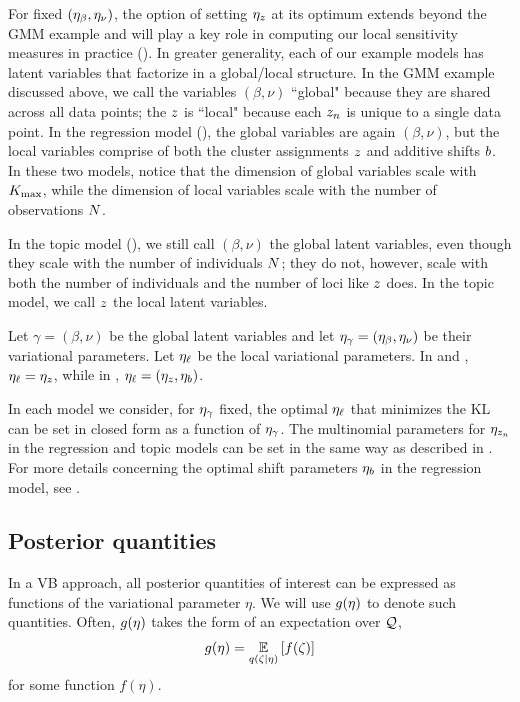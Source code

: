 For fixed $(\eta_{\beta}, \eta_{\nu})$, the option of setting $\eta_{z}$ at its optimum
extends beyond the GMM example and will play
a key role in computing our local sensitivity
measures in practice ().
In greater generality, each of our example models
has latent variables that factorize in a global/local structure.
In the GMM example discussed above, we call the variables $(\beta, \nu)$ ``global"
because they are shared across all data points; the $z$ is ``local"
because each $z_n$ is unique to a single data point.
In the regression model (),
the global variables are again $(\beta, \nu)$,
but the local variables comprise of both the cluster assignments $z$ and additive shifts $b$.
In these two models, notice that the dimension of global variables scale with ${K_{\mathrm{max}}}$, while
the dimension of local variables scale with the number of observations $N$.

In the topic model (),
we still call $(\beta, \nu)$ the global latent variables, even though they scale
with the number of individuals $N$;
they do not, however, scale with both the number of individuals and the number of loci
like $z$ does. In the topic model, we call $z$ the local latent variables.

Let $\gamma = (\beta,\nu)$ be the global latent variables
and let $\eta_{\gamma} = (\eta_{\beta}, \eta_{\nu})$ be their variational parameters.
Let $\eta_{\ell}$ be the local variational parameters. In  and
, $\eta_{\ell} = \eta_{z}$, while
in , $\eta_{\ell} = (\eta_{z}, \eta_b)$.

In each model we consider, for $\eta_{\gamma}$ fixed, the optimal $\eta_{\ell}$ that minimizes
the $\mathrm{KL}$ can be set in closed form as a function of $\eta_{\gamma}$.
The multinomial parameters for $\eta_{z_n}$ in the regression and topic models
can be set in the same way as described in .
For more details concerning the optimal shift parameters $\eta_b$
in the regression model, see .



\subsection{Posterior quantities}

In a VB approach, all posterior quantities of interest can be expressed as
functions of the variational parameter $\eta$. We will use $g(\eta)$ to denote
such quantities. Often, $g(\eta)$ takes the form of an expectation over $\mathcal{Q}$,
\begin{align*}
  g(\eta) = \underset{q(\zeta\vert\eta)}{\mathbb{E}}\left[f(\zeta)\right]
\end{align*}
for some function $f(\eta)$.

